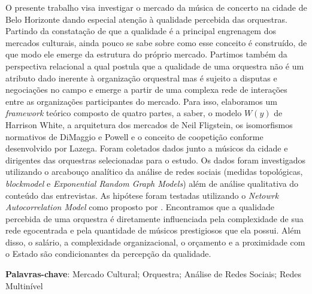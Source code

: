 \documentclass[a4paper, 12pt, openright, oneside, german, french, english, brazil]{abntex2}
\begin{document}
	\begin{resumo}
		O presente trabalho visa investigar o mercado da música de concerto na cidade de Belo Horizonte dando especial atenção à qualidade percebida das orquestras. Partindo da constatação de que a qualidade é a principal engrenagem dos mercados culturais, ainda pouco se sabe sobre como esse conceito é construído, de que modo ele emerge da estrutura do próprio mercado. Partimos também da perspectiva relacional a qual postula que a qualidade de uma orquestra não é um atributo dado inerente à organização orquestral mas é sujeito a disputas e negociações no campo e emerge a partir de uma complexa rede de interações entre as organizações participantes do mercado. Para isso, elaboramos um \textit{framework} teórico composto de quatro partes, a saber, o modelo $W(y)$ de Harrison White, a arquitetura dos mercados de Neil Fligstein, os isomorfismos normativos de DiMaggio e Powell e o conceito de coopetição conforme desenvolvido por Lazega. Foram coletados dados junto a músicos da cidade e dirigentes das orquestras selecionadas para o estudo. Os dados foram investigados utilizando o arcabouço analítico da análise de redes sociais (medidas topológicas, \textit{blockmodel} e \textit{Exponential Random Graph Models}) além de análise qualitativa do conteúdo das entrevistas. As hipótese foram testadas utilizando o \textit{Netowrk Autocorrelation Model} como proposto por . Encontramos que a qualidade percebida de uma orquestra é diretamente influenciada pela complexidade de sua rede egocentrada e pela quantidade de músicos prestigiosos que ela possui. Além disso, o salário, a complexidade organizacional, o orçamento e a proximidade com o Estado são condicionantes da percepção da qualidade.
		
		
		\vspace{\onelineskip}
		\noindent
		\textbf{Palavras-chave}: Mercado Cultural; Orquestra; Análise de Redes Sociais; Redes Multinível
	\end{resumo}
\end{document}
